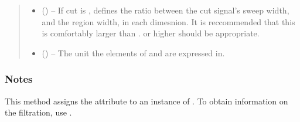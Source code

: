 \documentclass[letterpaper,10pt,english]{sphinxmanual}
\begin{document}
\begin{fulllineitems}
\begin{fulllineitems}
\begin{quote}
\begin{description}
\begin{itemize}
\item {} 
\sphinxAtStartPar
{} (\sphinxstyleliteralemphasis{\sphinxupquote{, }}) – If cut is , defines the ratio between the cut signal’s sweep
width, and the region width, in each dimesnion.
It is reccommended that this is comfortably larger than .
 or higher should be appropriate.

\item {} 
\sphinxAtStartPar
{} (\sphinxstyleliteralemphasis{\sphinxupquote{, }}\sphinxstyleliteralemphasis{\sphinxupquote{, }}) – The unit the elements of  and  are
expressed in.

\end{itemize}

\end{description}\end{quote}
\subsubsection*{Notes}

\sphinxAtStartPar
This method assigns the attribute  to an instance of
{\hyperref[\detokenize{references/freqfilter:nmrespy.freqfilter.FrequencyFilter}]{}}. To obtain information
on the filtration, use {\hyperref[\detokenize{references/core:nmrespy.core.Estimator.get_filter_info}]{}}.

\end{fulllineitems}



\end{fulllineitems}
\end{document}
